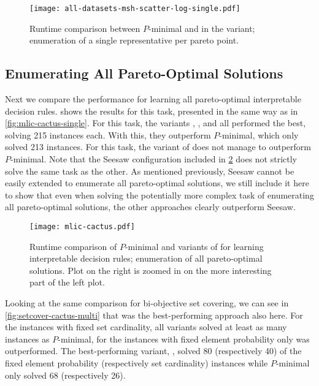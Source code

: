 \begin{figure}
  \centering
  \texttt{[image: all-datasets-msh-scatter-log-single.pdf]}
  \caption{Runtime comparison between $P$-minimal and \algname{} in the \msh{} variant;
    enumeration of a single representative per pareto point.
  }\label{fig:msh-scatter-single}
\end{figure}


\subsection{Enumerating All Pareto-Optimal Solutions}

Next we compare the performance for learning all pareto-optimal interpretable decision rules.
 shows the results for this task, presented in the same way as in \cref{fig:mlic-cactus-single}.
For this task, the \algname{} variants \satunsat{}, \unsatsat{}, \msu{} and \msh{} all performed the best, solving 215 instances each.
With this, they outperform $P$-minimal, which only solved 213 instances.
For this task, the \oll{} variant of \algname{} does not manage to outperform $P$-minimal.
Note that the Seesaw configuration included in \cref{fig:mlic-cactus-multi} does not strictly solve the same task as the other.
As mentioned previously, Seesaw cannot be easily extended to enumerate all pareto-optimal solutions, we still include it here to show that even when solving the potentially more complex task of enumerating all pareto-optimal solutions, the other approaches clearly outperform Seesaw.

\begin{figure}
  \centering
  \texttt{[image: mlic-cactus.pdf]}
  \caption{Runtime comparison of  $P$-minimal and variants of \algname{} for learning interpretable decision rules;
    enumeration of all pareto-optimal solutions.
    Plot on the right is zoomed in on the more interesting part of the left plot.
  }\label{fig:mlic-cactus-multi}
\end{figure}

Looking at the same comparison for bi-objective set covering, we can see in \cref{fig:setcover-cactus-multi} that \msh{} was the best-performing approach also here.
For the instances with fixed set cardinality, all \algname{} variants solved at least as many instances as $P$-minimal, for the instances with fixed element probability only \oll{} was outperformed.
The best-performing variant, \msh{}, solved 80 (respectively 40) of the fixed element probability (respectively set cardinality) instances while $P$-minimal only solved 68 (respectively 26).

